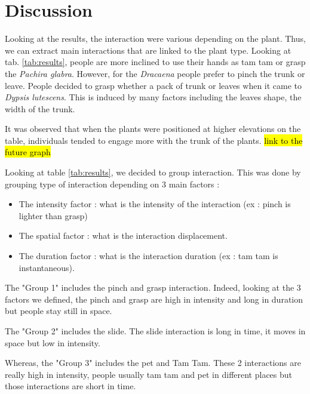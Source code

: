 \section{Discussion}

Looking at the results, the interaction were various depending on the plant. Thus, we can extract main interactions that are linked to the plant type. Looking at tab. \ref{tab:results}, people are more inclined to use their hands as tam tam or grasp the \textit{Pachira glabra}. However, for the \textit{Dracaena} people prefer to pinch the trunk or leave. People decided to grasp whether a pack of trunk or leaves when it came to \textit{Dypsis lutescens}.
This is induced by many factors including the leaves shape, the width of the trunk.


It was observed that when the plants were positioned at higher elevations on the table, individuals tended to engage more with the trunk of the plants. \hl{link to the future graph}

Looking at table \ref{tab:results}, we decided to group interaction. This was done by grouping type of interaction depending on 3 main factors :

\begin{itemize}
    \item The intensity factor : what is the intensity of the interaction (ex : pinch is lighter than grasp)
    \item The spatial factor : what is the interaction displacement.
    \item The duration factor : what is the interaction duration (ex : tam tam is instantaneous).
\end{itemize}

The "Group 1" includes the pinch and grasp interaction. Indeed, looking at the 3 factors we defined, the pinch and grasp are high in intensity and long in duration but people stay still in space.

The "Group 2" includes the slide. The slide interaction is long in time, it moves in space but low in intensity.

Whereas, the "Group 3" includes the pet and Tam Tam. These 2 interactions are really high in intensity, people usually tam tam and pet in different places but those interactions are short in time. 


